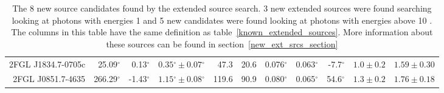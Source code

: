 \documentclass[12pt,preprint]{aastex}
\newcommand{\gev}{\text{GeV}\xspace}
\renewcommand{\deg}{\ensuremath{^\circ}\xspace}
\begin{document}
\begin{table}
\begin{centering}
\begin{tabular}{r|rrrrrrrrrr}
      2FGL J1834.7-0705c         &      25.09\deg &       0.13\deg & $  0.35\deg \pm   0.07\deg$ &     47.3 &       20.6 &  0.076\deg &  0.063\deg &   -7.7\deg & $    1.0 \pm     0.2$ & $   1.59 \pm    0.30$ \\
      2FGL J0851.7-4635          &     266.29\deg &      -1.43\deg & $  1.15\deg \pm   0.08\deg$ &    119.6 &       90.9 &  0.080\deg &  0.065\deg &   54.6\deg & $    1.3 \pm     0.2$ & $   1.76 \pm    0.18$ \\
      \hline
    \end{tabular}
    \caption{The 8 new source candidates found by the
    extended source search. 3 new extended sources were found searching looking at photons with energies 1 \gev and
    5 new candidates were found looking at photons with energies above 10 \gev.
    The columns in this table have the same definition as table~\ref{known_extended_sources}.
    More information about these sources can be found in section~\ref{new_ext_srcs_section}
    }
    \label{new_ext_srcs_table}
  \end{centering}
\end{table}
\end{document}
